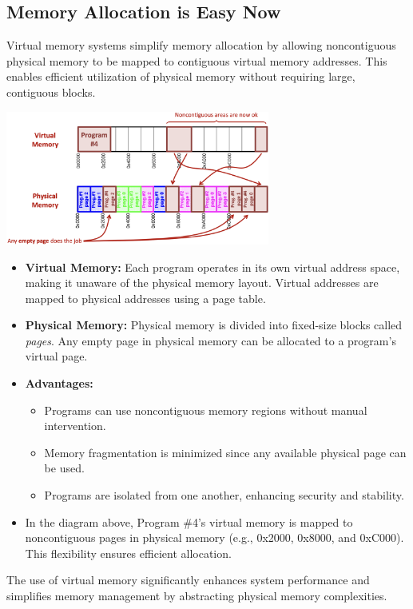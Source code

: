 \subsection{Memory Allocation is Easy Now}
Virtual memory systems simplify memory allocation by allowing noncontiguous physical memory to be mapped to contiguous virtual memory addresses. This enables efficient utilization of physical memory without requiring large, contiguous blocks.
\begin{center}
    \includegraphics[width=0.65\textwidth]{chapters/chapter3c/images/relocation_bis.png}
\end{center}
\begin{itemize}
    \item[] \textbf{Virtual Memory:} Each program operates in its own virtual address space, making it unaware of the physical memory layout. Virtual addresses are mapped to physical addresses using a page table.
    \item[] \textbf{Physical Memory:} Physical memory is divided into fixed-size blocks called \textit{pages}. Any empty page in physical memory can be allocated to a program's virtual page.
    \item[] \textbf{Advantages:}
    \begin{itemize}
        \item Programs can use noncontiguous memory regions without manual intervention.
        \item Memory fragmentation is minimized since any available physical page can be used.
        \item Programs are isolated from one another, enhancing security and stability.
    \end{itemize}
    \item[] In the diagram above, Program \#4's virtual memory is mapped to noncontiguous pages in physical memory (e.g., 0x2000, 0x8000, and 0xC000). This flexibility ensures efficient allocation.
\end{itemize}

The use of virtual memory significantly enhances system performance and simplifies memory management by abstracting physical memory complexities.

